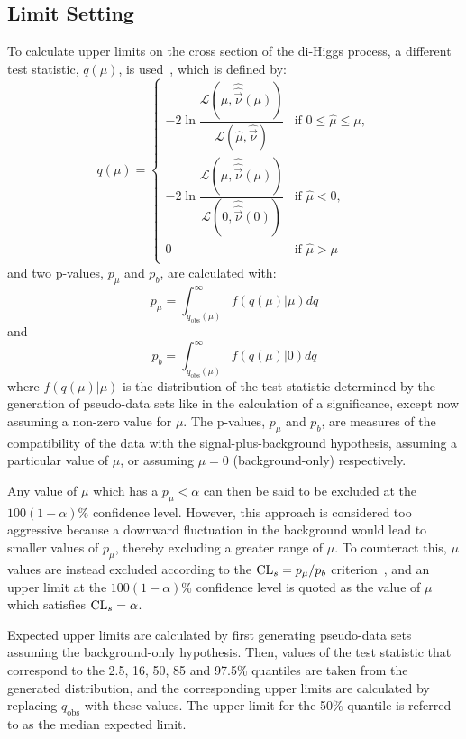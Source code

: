 \subsection{Limit Setting}\label{sec:stats_limits}
To calculate upper limits on the cross section of the di-Higgs process, a different test statistic, $q(\mu)$, is used~\cite{Cowan:2010js}, which is defined by:
\begin{equation}
  q(\mu) = \begin{cases}
    -2 \ln \dfrac{\mathcal{L}(\mu, \hat{\hat{\vec{\nu}}}(\mu))}{\mathcal{L}(\hat{\mu}, \hat{\vec{\nu}})}  & \text{if } 0 \leq \hat{\mu} \leq \mu, \\
    -2 \ln\dfrac{\mathcal{L}(\mu, \hat{\hat{\vec{\nu}}}(\mu))}{\mathcal{L}(0, \hat{\hat{\vec{\nu}}}(0))} & \text{if } \hat{\mu} <0, \\
    0 & \text{if } \hat{\mu} > \mu \\
  \end{cases}
\end{equation}
and two p-values, $p_\mu$ and $p_b$, are calculated with:
\begin{equation}
  p_\mu = \int_{q_{\text{obs}}(\mu)}^\infty f(q(\mu)|\mu) dq
\end{equation}
and
\begin{equation}
  p_b = \int_{q_{\text{obs}}(\mu)}^\infty f(q(\mu)|0) dq
\end{equation}
where $f(q(\mu)|\mu)$ is the distribution of the test statistic determined by the generation of pseudo-data sets like in the calculation of a significance, except now assuming a non-zero value for $\mu$. The p-values, $p_\mu$ and $p_b$, are measures of the compatibility of the data with the signal-plus-background hypothesis, assuming a particular value of $\mu$, or assuming $\mu=0$ (background-only) respectively. 

Any value of $\mu$ which has a $p_\mu < \alpha$ can then be said to be excluded at the $100(1-\alpha)$\% confidence level. However, this approach is considered too aggressive because a downward fluctuation in the background would lead to smaller values of $p_\mu$, thereby excluding a greater range of $\mu$. To counteract this, $\mu$ values are instead excluded according to the $\text{CL}_s=p_\mu / p_b$ criterion~\cite{ParticleDataGroup:2020ssz,Junk:1999kv,Read:2002hq}, and an upper limit at the $100(1-\alpha)$\% confidence level is quoted as the value of $\mu$ which satisfies $\text{CL}_s = \alpha$.

Expected upper limits are calculated by first generating pseudo-data sets assuming the background-only hypothesis. Then, values of the test statistic that correspond to the 2.5, 16, 50, 85 and 97.5\% quantiles are taken from the generated distribution, and the corresponding upper limits are calculated by replacing $q_{\text{obs}}$ with these values. The upper limit for the 50\% quantile is referred to as the median expected limit.

